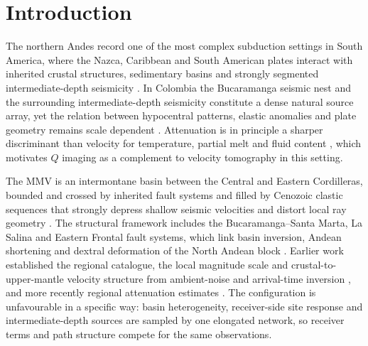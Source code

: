 \documentclass[review,authoryear,longtitle]{elsarticle}
\begin{document}
\section{Introduction}

The northern Andes record one of the most complex subduction settings in
South America, where the Nazca, Caribbean and South American plates
interact with inherited crustal structures, sedimentary basins and
strongly segmented intermediate-depth seismicity
\citep{Taboada2000,VanDerHilst1994,Syracuse2016,Schellart2023}. In
Colombia the Bucaramanga seismic nest and the surrounding
intermediate-depth seismicity constitute a dense natural source array, yet
the relation between hypocentral patterns, elastic anomalies and plate
geometry remains scale dependent
\citep{Zarifi2007,Londono2019,SepulvedaJaimes2018,Hayes2018Slab2}.
Attenuation is in principle a sharper discriminant than velocity for
temperature, partial melt and fluid content
\citep{Hacker2003,Mavko2009,vanKeken2011}, which motivates
$Q$ imaging as a complement to velocity tomography in this setting.

The MMV is an intermontane basin between the Central and Eastern
Cordilleras, bounded and crossed by inherited fault systems and filled by
Cenozoic clastic sequences that strongly depress shallow seismic
velocities and distort local ray geometry
\citep{MojicaFranco1990,GomezTapias2019}. The structural framework
includes the Bucaramanga--Santa Marta, La Salina and Eastern Frontal fault
systems, which link basin inversion, Andean shortening and dextral
deformation of the North Andean block
\citep{MojicaFranco1990,Audemard2021,Muller2010}. Earlier work
established the regional catalogue, the local magnitude scale and
crustal-to-upper-mantle velocity structure from ambient-noise and
arrival-time inversion
\citep{OjedaHavskov2001,Poveda2018,LondonoRomero2017,Londono2020Velocity,HavskovOttemoller2010},
and more recently regional attenuation estimates
\citep{Londono2022Attenuation,CastelblancoOssa2023,Castelblanco2025Attenuation}.
The configuration is unfavourable in a specific way: basin heterogeneity,
receiver-side site response and intermediate-depth sources are sampled by
one elongated network, so receiver terms and path structure compete for
the same observations.
\end{document}
